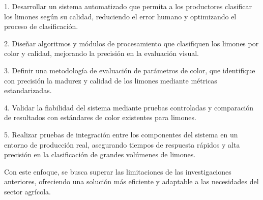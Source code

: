 1. Desarrollar un sistema automatizado que permita a los productores clasificar los limones según su calidad, reduciendo el error humano y optimizando el proceso de clasificación.
  
2. Diseñar algoritmos y módulos de procesamiento que clasifiquen los limones por color y calidad, mejorando la precisión en la evaluación visual.

3. Definir una metodología de evaluación de parámetros de color, que identifique con precisión la madurez y calidad de los limones mediante métricas estandarizadas.

4. Validar la fiabilidad del sistema mediante pruebas controladas y comparación de resultados con estándares de color existentes para limones.

5. Realizar pruebas de integración entre los componentes del sistema en un entorno de producción real, asegurando tiempos de respuesta rápidos y alta precisión en la clasificación de grandes volúmenes de limones.

Con este enfoque, se busca superar las limitaciones de las investigaciones anteriores, ofreciendo una solución más eficiente y adaptable a las necesidades del sector agrícola.
